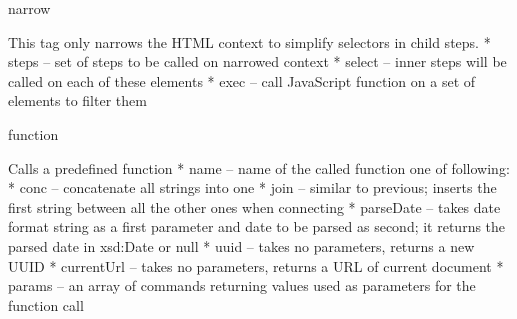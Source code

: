 \secc narrow

This tag only narrows the HTML context to simplify selectors in child steps. 
\begitems
  * steps -- set of steps to be called on narrowed context
  * select -- inner steps will be called on each of these elements
  * exec -- call JavaScript function on a set of elements to filter them
\enditems

\secc function

Calls a predefined function
\begitems
  * name -- name of the called function one of following: 
  \begitems
    * conc -- concatenate all strings into one
    * join -- similar to previous; inserts the first string between all the other ones when connecting
    * parseDate -- takes date format string as a first parameter and date to be parsed as second; 
              it returns the parsed date in xsd:Date or null
    * uuid -- takes no parameters, returns a new UUID
    * currentUrl -- takes no parameters, returns a URL of current document
  \enditems
  * params -- an array of commands returning values used as parameters for the function call
\enditems

